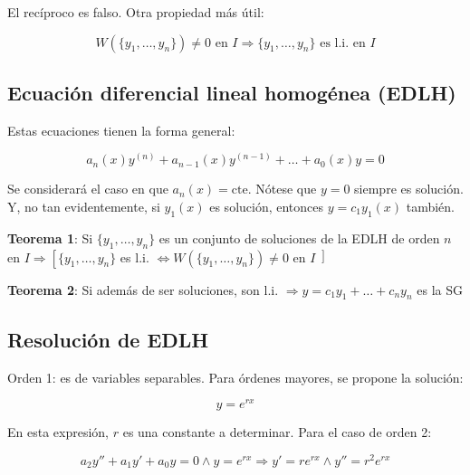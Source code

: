 \documentclass{article}
\begin{document}
El recíproco es falso. Otra propiedad más útil:

\begin{equation}
W(\{y_1, \ldots, y_n\}) \neq 0 \text{ en } I \Rightarrow \{y_1, \ldots, y_n\} \text{ es l.i. en } I
\end{equation}

\subsection{Ecuación diferencial lineal homogénea (EDLH)}

Estas ecuaciones tienen la forma general:

\begin{equation}
a_n(x) y^{(n)} + a_{n-1}(x) y^{(n-1)} + \ldots + a_0(x) y = 0
\end{equation}

Se considerará el caso en que $a_n(x) = \text{cte}$. Nótese que $y = 0$ siempre es solución. Y, no tan evidentemente, si $y_1(x)$ es solución, entonces $y = c_1 y_1(x)$ también.

\vspace{10 pt}

\textbf{Teorema 1}: Si $\{y_1, \ldots, y_n\}$ es un conjunto de soluciones de la EDLH de orden $n$ en $I  \Rightarrow \left[ \{y_1, \ldots, y_n\} \right.$ es l.i. $\Leftrightarrow W(\{y_1, \ldots, y_n\}) \neq 0$ en $I \left] \right.$

\vspace{10 pt}

\textbf{Teorema 2}: Si además de ser soluciones, son l.i. $\Rightarrow y = c_1 y_1 + \ldots + c_n y_n $ es la SG

\subsection{Resolución de EDLH}

Orden 1: es de variables separables. Para órdenes mayores, se propone la solución:

\begin{equation}
y = e^{r x}
\end{equation}

En esta expresión, $r$ es una constante a determinar. Para el caso de orden 2:

\begin{equation}
a_2 y'' + a_1 y' + a_0 y = 0 \wedge y = e^{r x} \Rightarrow y' = r e^{r x} \wedge y'' = r^2 e^{r x}
\end{equation}
\end{document}
